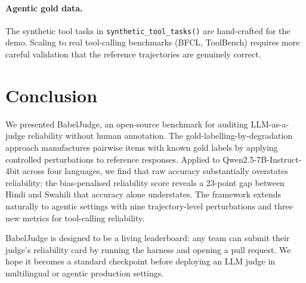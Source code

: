 \documentclass[11pt]{article}
\begin{document}
\paragraph{Agentic gold data.}
The synthetic tool tasks in \texttt{synthetic\_tool\_tasks()} are hand-crafted for the demo. Scaling to real tool-calling benchmarks (BFCL, ToolBench) requires more careful validation that the reference trajectories are genuinely correct.

\section{Conclusion}
\label{sec:conclusion}

We presented BabelJudge, an open-source benchmark for auditing LLM-as-a-judge reliability without human annotation. The gold-labelling-by-degradation approach manufactures pairwise items with known gold labels by applying controlled perturbations to reference responses. Applied to Qwen2.5-7B-Instruct-4bit across four languages, we find that raw accuracy substantially overstates reliability: the bias-penalised reliability score reveals a 23-point gap between Hindi and Swahili that accuracy alone understates. The framework extends naturally to agentic settings with nine trajectory-level perturbations and three new metrics for tool-calling reliability.

BabelJudge is designed to be a living leaderboard: any team can submit their judge's reliability card by running the harness and opening a pull request. We hope it becomes a standard checkpoint before deploying an LLM judge in multilingual or agentic production settings.



\end{document}
